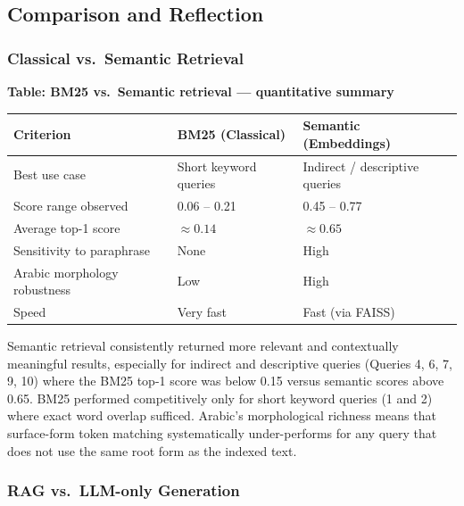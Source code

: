 \subsection{Comparison and Reflection}

\subsubsection{Classical vs.\ Semantic Retrieval}

\begin{center}
\textbf{Table: BM25 vs.\ Semantic retrieval --- quantitative summary}\\[4pt]
\begin{tabularx}{\textwidth}{|p{5.5cm}|X|X|}
\hline
\rowcolor{best}
\textbf{Criterion} & \textbf{BM25 (Classical)} & \textbf{Semantic (Embeddings)} \\
\hline
Best use case              & Short keyword queries   & Indirect / descriptive queries \\
\hline
Score range observed       & 0.06 -- 0.21            & 0.45 -- 0.77 \\
\hline
Average top-1 score        & $\approx 0.14$          & $\approx 0.65$ \\
\hline
Sensitivity to paraphrase  & None                    & High \\
\hline
Arabic morphology robustness & Low                  & High \\
\hline
Speed                      & Very fast               & Fast (via FAISS) \\
\hline
\end{tabularx}
\end{center}

Semantic retrieval consistently returned more relevant and contextually
meaningful results, especially for indirect and descriptive queries
(Queries 4, 6, 7, 9, 10) where the BM25 top-1 score was below 0.15
versus semantic scores above 0.65.  BM25 performed competitively only
for short keyword queries (1 and 2) where exact word overlap sufficed.
Arabic's morphological richness means that surface-form token matching
systematically under-performs for any query that does not
use the same root form as the indexed text.

\subsubsection{RAG vs.\ LLM-only Generation}

